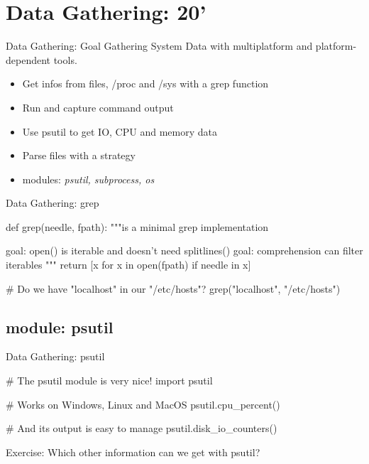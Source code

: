 \section{Data Gathering: 20'}
%
%


\begin{frame}{Data Gathering: Goal}
    Gathering System Data with multiplatform
     and platform-dependent tools.
\begin{itemize}
\item Get infos from files, /proc and /sys with a grep function
\item Run and capture command output
\item Use psutil to get IO, CPU and memory data
\item Parse files with a strategy
\item modules: \emph{psutil, subprocess, os}
\end{itemize}

\end{frame}


\begin{frame}[fragile]{Data Gathering: grep}
\begin{pythoncode}
def grep(needle, fpath):
    """is a minimal grep implementation

       goal: open() is iterable and doesn't
             need splitlines()
       goal: comprehension can filter iterables
    """
    return [x for x in open(fpath) if needle in x]
    
# Do we have "localhost" in our "/etc/hosts"?
grep("localhost", "/etc/hosts")
\end{pythoncode}
\end{frame}

\subsection{module: psutil}
\begin{frame}[fragile]{Data Gathering: psutil}
\begin{pythoncode}
# The psutil module is very nice!
import psutil

# Works on Windows, Linux and MacOS
psutil.cpu_percent()

# And its output is easy to manage
psutil.disk_io_counters()

\end{pythoncode}
Exercise: Which other information can we get with psutil?
\end{frame}


